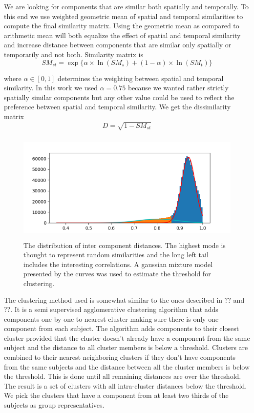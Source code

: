\documentclass[]{article}
\begin{document}
We are looking for components that are similar both spatially and temporally. To this end we use weighted geometric mean of spatial and temporal similarities to compute the final similarity matrix. Using the geometric mean as compared to arithmetic mean will both equalize the effect of spatial and temporal similarity and increase distance between components that are similar only spatially or temporarily and not both. Similarity matrix is
\begin{equation}
	SM_{st} = \exp \{ \alpha \times \ln(SM_s) + (1 - \alpha) \times \ln(SM_t) \} 
\end{equation}

where $\alpha \in [0,1]$ determines the weighting between spatial and temporal similarity. In this work we used $\alpha = 0.75$ because we wanted rather strictly spatially similar components but any other value could be used to reflect the preference between spatial and temporal similarity. We get the dissimilarity matrix 
\begin{equation}
D = \sqrt{1 - SM_{st}}
\end{equation}

\begin{figure}
    \centering
    \includegraphics[height=5.5cm]{images/distance_distributions.png}
    \caption{The distribution of inter component distances. The highest mode is thought to represent random similarities and the long left tail includes the interesting correlations. A gaussian mixture model presented by the curves was used to estimate the threshold for clustering.}
    \label{fig:distance-distribution}
\end{figure}

The clustering method used is somewhat similar to the ones described in ?? and ??. It is a semi supervised  agglomerative clustering algorithm that adds components one by one to nearest cluster making sure there is only one component from each subject. The algorithm adds components to their closest cluster provided that the cluster doesn't already have a component from the same subject and the distance to all cluster members is below a threshold. Clusters are combined to their nearest neighboring clusters if they don't have components from the same subjects and the distance between all the cluster members is below the threshold. This is done until all remaining distances are over the threshold. The result is a set of clusters with all intra-cluster distances below the threshold. We pick the clusters that have a component from at least two thirds of the subjects as group representatives. 
\end{document}
